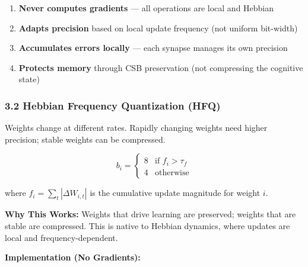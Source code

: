 \documentclass[
  11pt,
  a4paper,
]{article}
\providecommand{\tightlist}{%
  \setlength{\itemsep}{0pt}\setlength{\parskip}{0pt}}
\begin{document}
\begin{enumerate}
\def\labelenumi{\arabic{enumi}.}
\tightlist
\item
  \textbf{Never computes gradients} --- all operations are local and
  Hebbian
\item
  \textbf{Adapts precision} based on local update frequency (not uniform
  bit-width)
\item
  \textbf{Accumulates errors locally} --- each synapse manages its own
  precision
\item
  \textbf{Protects memory} through CSB preservation (not compressing the
  cognitive state)
\end{enumerate}

\subsubsection{3.2 Hebbian Frequency Quantization
(HFQ)}\label{hebbian-frequency-quantization-hfq}

Weights change at different rates. Rapidly changing weights need higher
precision; stable weights can be compressed.

\[
b_i = \begin{cases}
8 & \text{if } f_i > \tau_f \\
4 & \text{otherwise}
\end{cases}
\]

where \(f_i = \sum_{t} |\Delta W_{i,t}|\) is the cumulative update
magnitude for weight \(i\).

\textbf{Why This Works:} Weights that drive learning are preserved;
weights that are stable are compressed. This is native to Hebbian
dynamics, where updates are local and frequency-dependent.

\textbf{Implementation (No Gradients):}
\end{document}

